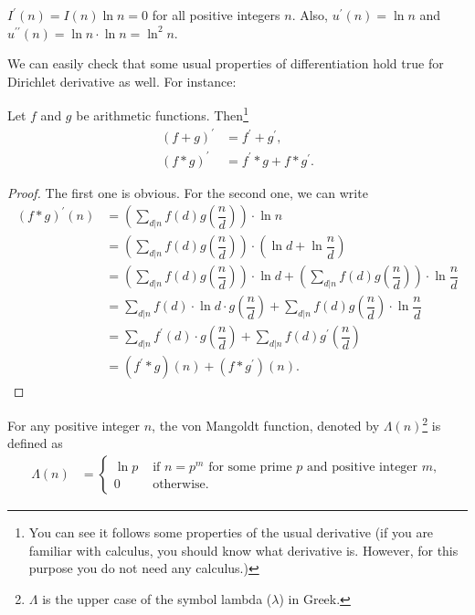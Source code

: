 \documentclass{subfile}
\begin{document}
	\begin{example}
		$I^\prime(n)=I(n)\ln n=0$ for all positive integers $n$. Also, $u^\prime(n)=\ln n$ and $u^{\prime\prime}(n)=\ln n\cdot\ln n=\ln^2 n$.
	\end{example}
We can easily check that some usual properties of differentiation hold true for Dirichlet derivative as well. For instance:
	\begin{proposition}
		Let $f$ and $g$ be arithmetic functions. Then\footnote{You can see it follows some properties of the usual derivative (if you are familiar with calculus, you should know what derivative is. However, for this purpose you do not need any calculus.)}
			\begin{align*}
				(f+g)^\prime & =f^\prime+g^\prime,\\
				(f\ast g)^\prime& =f^\prime \ast g + f\ast g^\prime.
			\end{align*}
	\end{proposition}
	\begin{proof}
		The first one is obvious. For the second one, we can write
			\begin{align*}
				(f\ast g)^\prime (n)
					&= \left(\sum_{d|n} f(d)g\left(\dfrac{n}{d}\right)\right) \cdot \ln n\\
					&= \left(\sum_{d|n} f(d)g\left(\dfrac{n}{d}\right)\right) \cdot \left(\ln d + \ln \dfrac{n}{d}\right)\\
					&= \left(\sum_{d|n} f(d)g\left(\dfrac{n}{d}\right)\right) \cdot \ln d + \left(\sum_{d|n} f(d)g\left(\dfrac{n}{d}\right)\right) \cdot \ln \dfrac{n}{d}\\
					&= \sum_{d|n} f(d)\cdot \ln d \cdot g\left(\dfrac{n}{d}\right)+ \sum_{d|n} f(d) g\left(\dfrac{n}{d}\right) \cdot \ln \dfrac{n}{d}\\
					&= \sum_{d|n} f^\prime(d) \cdot g\left(\dfrac{n}{d}\right)+ \sum_{d|n} f(d) g^\prime\left(\dfrac{n}{d}\right)\\
					&= (f^\prime \ast g)(n) + (f\ast g^\prime)(n).
			\end{align*}

	\end{proof}
	\begin{definition}
		For any positive integer $n$, the von Mangoldt function, denoted by $\Lambda(n)$\footnote{$\Lambda$ is the upper case of the symbol lambda ($\lambda$) in Greek.} is defined as
			\begin{align*}
				\Lambda(n) & =
					\begin{cases}\ln p &\mbox{ if }n=p^m\mbox{ for  some prime }p\mbox{ and positive integer }m,\\0&\mbox{ otherwise}.\end{cases}
			\end{align*}
	\end{definition}
	
\end{document}
